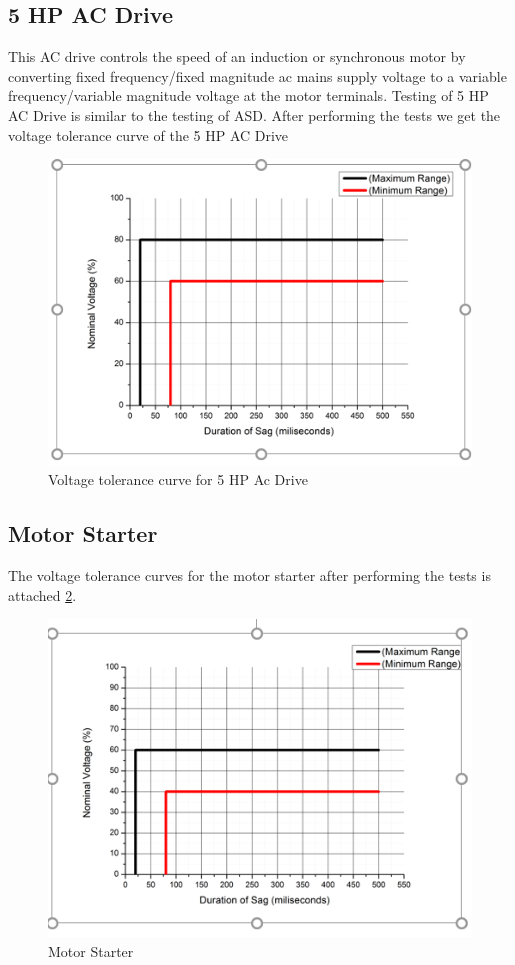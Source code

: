 \documentclass[14pt, a4paper]{extreport}
\begin{document}
 \subsection{5 HP AC Drive} This AC drive controls the speed of an induction or synchronous motor by converting fixed frequency/fixed magnitude ac mains supply voltage to a variable frequency/variable magnitude voltage at the motor terminals. Testing of 5 HP AC Drive is similar to the testing of ASD. After performing the tests we get the voltage tolerance curve of the 5 HP AC Drive
 \begin{figure}
     \centering
     \includegraphics[width=\textwidth]{5hpacdrive.PNG}
     \caption{Voltage tolerance curve for 5 HP Ac Drive}
     \label{fig:5hp_ac_drive}
 \end{figure}
 \subsection{Motor Starter}The voltage tolerance curves for the motor starter after performing the tests is attached \ref{fig:motor_starter}.
 \begin{figure}
     \centering
     \includegraphics[width=\textwidth]{motorstarter.PNG}
     \caption{Motor Starter}
     \label{fig:motor_starter}
 \end{figure}
\end{document}
